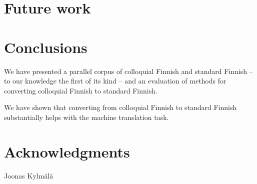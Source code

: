 \documentclass[11pt]{article}
\begin{document}
\section{Future work}

% 

\section{Conclusions}

We have presented a parallel corpus of colloquial Finnish and standard Finnish --
to our knowledge the first of its kind -- and an evaluation of methods for 
converting colloquial Finnish to standard Finnish. 

We have shown that converting from colloquial Finnish to standard Finnish substantially
helps with the machine translation task.


\section*{Acknowledgments}

Joonas Kylm\"{a}l\"{a}



\end{document}

